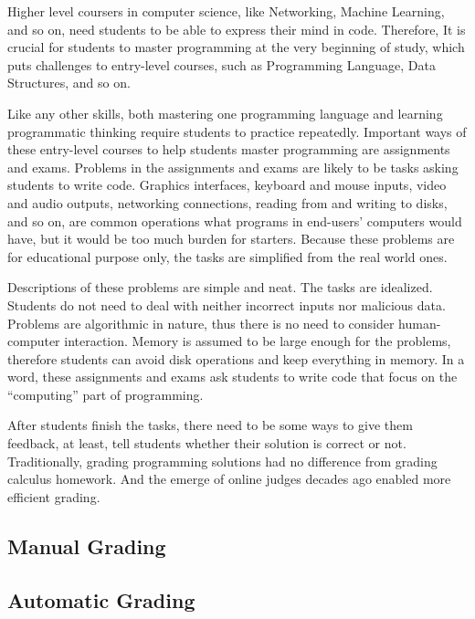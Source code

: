         Higher level coursers in computer science, like Networking, Machine Learning, and so on,
        need students to be able to express their mind in code.
        Therefore, It is crucial for students to master programming at the very beginning of study,
        which puts challenges to entry-level courses, such as Programming Language, Data Structures, and so on.

        Like any other skills, both mastering one programming language and learning programmatic thinking
        require students to practice repeatedly.
        Important ways of these entry-level courses to help students master programming are assignments and exams.
        Problems in the assignments and exams are likely to be tasks asking students to write code.
        Graphics interfaces, keyboard and mouse inputs, video and audio outputs, networking connections,
        reading from and writing to disks, and so on, are common operations what programs in end-users' computers would have,
        but it would be too much burden for starters.
        Because these problems are for educational purpose only, the tasks are simplified from the real world ones.

        Descriptions of these problems are simple and neat. The tasks are idealized.
        Students do not need to deal with neither incorrect inputs nor malicious data.
        Problems are algorithmic in nature, thus there is no need to consider human-computer interaction.
        Memory is assumed to be large enough for the problems, therefore students can avoid disk operations
        and keep everything in memory.
        In a word, these assignments and exams ask students to write code that focus on the ``computing'' part of programming.

        After students finish the tasks, there need to be some ways to give them feedback, at least,
        tell students whether their solution is correct or not.
        Traditionally, grading programming solutions had no difference from grading calculus homework.
        And the emerge of online judges decades ago enabled more efficient grading.
        
    \subsection{Manual Grading}

    \subsection{Automatic Grading}

